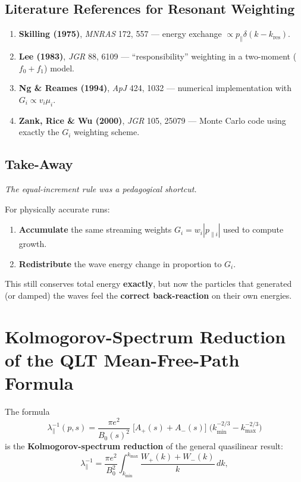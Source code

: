\subsection*{Literature References for Resonant Weighting}

\begin{enumerate}
  \item \textbf{Skilling (1975)}, \textit{MNRAS} 172, 557 — energy exchange $\propto p_\parallel \delta(k - k_{\text{res}})$.
  \item \textbf{Lee (1983)}, \textit{JGR} 88, 6109 — “responsibility” weighting in a two-moment ($f_0 + f_1$) model.
  \item \textbf{Ng \& Reames (1994)}, \textit{ApJ} 424, 1032 — numerical implementation with $G_i \propto v_i \mu_i$.
  \item \textbf{Zank, Rice \& Wu (2000)}, \textit{JGR} 105, 25079 — Monte Carlo code using exactly the $G_i$ weighting scheme.
\end{enumerate}

\subsection*{Take-Away}

\textit{The equal-increment rule was a pedagogical shortcut.}

For physically accurate runs:
\begin{enumerate}
  \item \textbf{Accumulate} the same streaming weights $G_i = w_i |p_{\parallel i}|$ used to compute growth.
  \item \textbf{Redistribute} the wave energy change in proportion to $G_i$.
\end{enumerate}

\noindent
This still conserves total energy \textbf{exactly}, but now the particles that generated (or damped) the waves feel the \textbf{correct back-reaction} on their own energies.

\section*{Kolmogorov-Spectrum Reduction of the QLT Mean-Free-Path Formula}

The formula
\[
\boxed{
\lambda_\parallel^{-1}(p,s)
   = \frac{\pi e^{2}}{B_0(s)^{2}}\;
     \bigl[A_{+}(s)+A_{-}(s)\bigr]\;
     \bigl(k_{\min}^{-2/3}-k_{\max}^{-2/3}\bigr)
}
\]
is the \textbf{Kolmogorov-spectrum reduction} of the general quasilinear result:
\[
\lambda_\parallel^{-1}
   = \frac{\pi e^{2}}{B_0^{2}}
     \int_{k_{\min}}^{k_{\max}}
     \frac{W_{+}(k)+W_{-}(k)}{k}\,dk,
\tag{QLT}
\]

